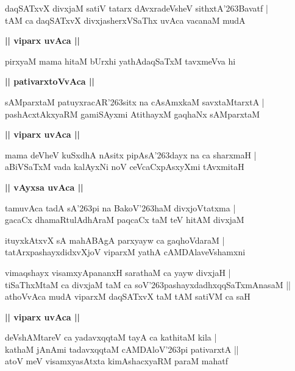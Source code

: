\documentclass[twoside,12pt,openright]{book}
\def\S{\char'263}
\newcounter{shloka}[chapter]
\def\uvaca#1{\centerline{{\large\textbf{#1}}}}
\begin{document}
\begin{shloka}%
daqSATxvX divxjaM satiV tatarx dAvxradeVsheV sithxtA\S Bavatf |\\
tAM ca daqSATxvX divxjasherxVSaThx uvAca vacanaM mudA 
\end{shloka}

\uvaca{|| viparx uvAca ||}

\begin{shloka}%
pirxyaM mama hitaM bUrxhi yathAdaqSaTxM tavxmeVva hi 
\end{shloka}

\uvaca{|| pativarxtoVvAca ||}

\begin{shloka}%
sAMparxtaM patuyxracAR\S sitx na cAsAmxkaM savxtaMtarxtA |\\
pashAcxtAkxyaRM gamiSAyxmi AtithayxM gaqhaNx sAMparxtaM 
\end{shloka}

\uvaca{|| viparx uvAca ||}

\begin{shloka}%
mama deVheV kuSxdhA nAsitx pipAsA\S dayx na ca sharxmaH |\\
aBiVSaTxM vada kalAyxNi noV ceVcaCxpAsxyXmi tAvxmitaH 
\end{shloka}

\uvaca{|| vAyxsa uvAca ||}

\begin{shloka}%
tamuvAca tadA sA\S pi na BakoV\S haM divxjoVtatxma |\\
gacaCx dhamaRtulAdhAraM paqcaCx taM teV hitAM divxjaM 
\end{shloka}

\begin{shloka}%
ituyxkAtxvX sA mahABAgA parxyayw ca gaqhoVdaraM |\\
tatArxpashayxdidxvXjoV viparxM yathA cAMDAlaveVshamxni
\end{shloka}

\begin{shloka}%
vimaqshayx visamxyApananxH sarathaM ca yayw divxjaH |\\
tiSaThxMtaM ca divxjaM taM ca soV\S pashayxdadhxqqSaTxmAnasaM ||\\
athoVvAca mudA viparxM daqSATxvX taM tAM satiVM ca saH 
\end{shloka}

\uvaca{|| viparx uvAca ||}

\begin{shloka}%
deVshAMtareV ca yadavxqqtaM tayA ca kathitaM kila |\\
kathaM jAnAmi tadavxqqtaM cAMDAloV\S pi pativarxtA ||\\
atoV meV visamxyasAtxta kimAshacxyaRM paraM mahatf
\end{shloka}
\end{document}
